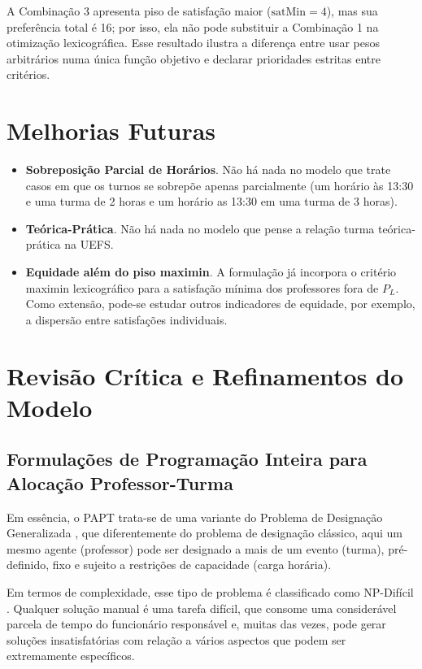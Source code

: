 \documentclass[11pt,a4paper]{article}
\begin{document}
A Combinação 3 apresenta piso de satisfação maior ($\mathrm{satMin}=4$), mas sua preferência total é 16; por isso, ela não pode substituir a Combinação 1 na otimização lexicográfica. Esse resultado ilustra a diferença entre usar pesos arbitrários numa única função objetivo e declarar prioridades estritas entre critérios.

\section{Melhorias Futuras}
\begin{itemize}
    \item \textbf{Sobreposição Parcial de Horários}. Não há nada no modelo que trate casos em que os turnos se sobrepõe apenas parcialmente (um horário às 13:30 e uma turma de 2 horas e um horário as 13:30 em uma turma de 3 horas).
    \item \textbf{Teórica-Prática}. Não há nada no modelo que pense a relação turma teórica-prática na UEFS.
    \item \textbf{Equidade além do piso maximin}. A formulação já incorpora o critério maximin lexicográfico para a satisfação mínima dos professores fora de $P_L$. Como extensão, pode-se estudar outros indicadores de equidade, por exemplo, a dispersão entre satisfações individuais.
\end{itemize}

\section{Revisão Crítica e Refinamentos do Modelo}\label{sec:refinamentos}


\subsection{Formulações de Programação Inteira para Alocação Professor-Turma}


Em essência, o PAPT trata-se de uma variante do Problema de Designação Generalizada \cite{arenales2007pesquisa}, que diferentemente do problema de designação clássico, aqui um mesmo agente (professor) pode ser designado a mais de um evento (turma), pré-definido, fixo e sujeito a restrições de capacidade (carga horária). 

Em termos de complexidade, esse tipo de problema é classificado como NP-Difícil \cite{martellototh1990}. Qualquer solução manual é uma tarefa difícil, que consome uma considerável parcela de tempo do funcionário responsável e, muitas das vezes, pode gerar soluções insatisfatórias com relação a vários aspectos que podem ser extremamente específicos.
\end{document}
